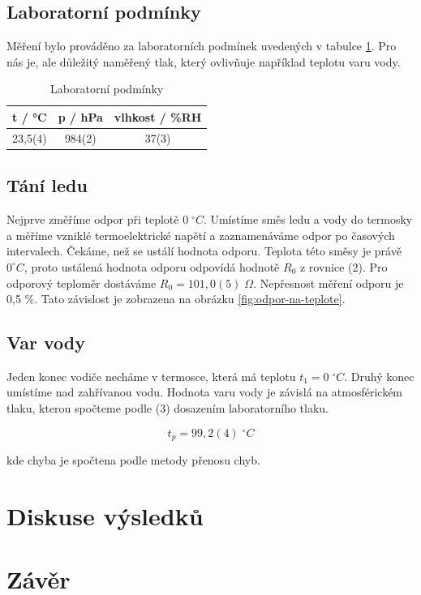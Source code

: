 \subsection{Laboratorní podmínky}

    Měření bylo prováděno za laboratorních podmínek uvedených v tabulce \ref{tab:lab_pod}. Pro nás je, ale důležitý naměřený tlak, který ovlivňuje například teplotu varu vody.

    \begin{table}[h]
        \centering
        \begin{tabular}{|c|c|c|} 
        \hline
            t / °C & p / hPa & vlhkost / \%RH  \\ 
        \hline
            23,5(4)   & 984(2)   & 37(3)            \\
        \hline
        \end{tabular}
        \caption{Laboratorní podmínky}
        \label{tab:lab_pod}
    \end{table}

\subsection{Tání ledu}
Nejprve změříme odpor při teplotě $0 \; ^\circ C$. Umístíme směs ledu a vody do termosky a měříme vzniklé termoelektrické napětí a zaznamenáváme odpor po časových intervalech. Čekáme, než se ustálí hodnota odporu. Teplota této směsy je právě $0 ^\circ C$, proto ustálená hodnota odporu odpovídá hodnotě $R_0$ z rovnice (2). Pro odporový teploměr dostáváme $R_0 = 101,0(5) \; \Omega$. Nepřesnost měření odporu je 0,5 \%. Tato závislost je zobrazena na obrázku \ref{fig:odpor-na-teplote}.

\subsection{Var vody}
Jeden konec vodiče necháme v termosce, která má teplotu $t_1 = 0 \; ^\circ C$. Druhý konec umístíme nad zahřívanou vodu. Hodnota varu vody je závislá na atmosférickém tlaku, kterou spočteme podle (3) dosazením laboratorního tlaku.

\begin{equation}
    \nonumber
    t_p = 99,2(4) \; ^\circ C
\end{equation}

kde chyba je spočtena podle metody přenosu chyb.
    
\section{Diskuse výsledků}

\section{Závěr}
